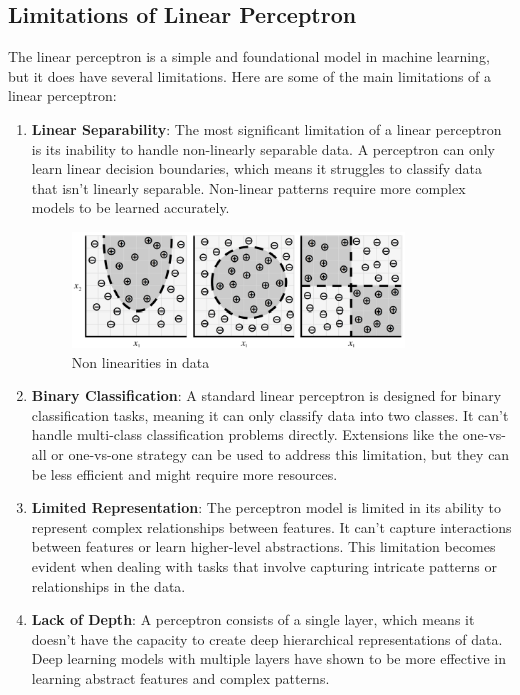 \documentclass{report}
\begin{document}
\subsection{Limitations of Linear Perceptron}
The linear perceptron is a simple and foundational model in machine learning, but it does have several limitations. Here are some of the main limitations of a linear perceptron:

\begin{enumerate}
    \item \textbf{Linear Separability}: The most significant limitation of a linear perceptron is its inability to handle non-linearly separable data. A perceptron can only learn linear decision boundaries, which means it struggles to classify data that isn't linearly separable. Non-linear patterns require more complex models to be learned accurately.
		\begin{figure}[h]
			\includegraphics[width=250pt]{1}
			\centering
			\caption{Non linearities in data}
		\end{figure}

    \item \textbf{Binary Classification}: A standard linear perceptron is designed for binary classification tasks, meaning it can only classify data into two classes. It can't handle multi-class classification problems directly. Extensions like the one-vs-all or one-vs-one strategy can be used to address this limitation, but they can be less efficient and might require more resources.

    \item \textbf{Limited Representation}: The perceptron model is limited in its ability to represent complex relationships between features. It can't capture interactions between features or learn higher-level abstractions. This limitation becomes evident when dealing with tasks that involve capturing intricate patterns or relationships in the data.

    \item \textbf{Lack of Depth}: A perceptron consists of a single layer, which means it doesn't have the capacity to create deep hierarchical representations of data. Deep learning models with multiple layers have shown to be more effective in learning abstract features and complex patterns.


\end{enumerate}
\end{document}
